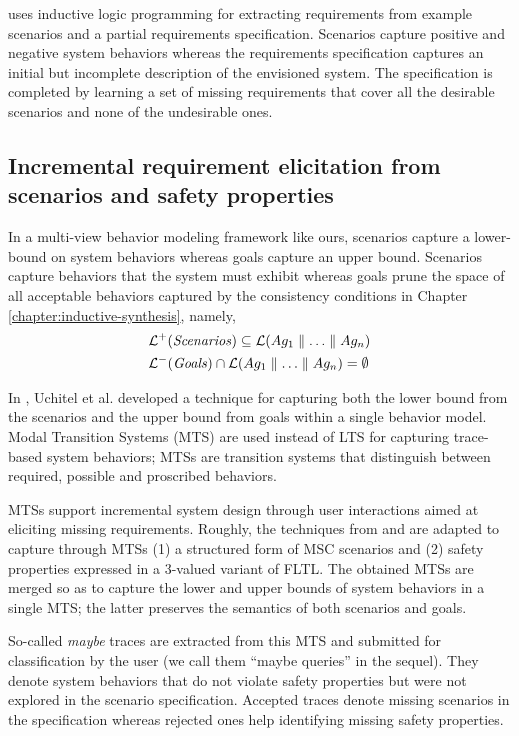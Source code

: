 \cite{Alrajeh:2007} uses inductive logic programming for extracting requirements from example scenarios and a partial requirements specification. Scenarios capture positive and negative system behaviors whereas the requirements specification captures an initial but incomplete description of the envisioned system. The specification is completed by learning a set of missing requirements that cover all the desirable scenarios and none of the undesirable ones.

\subsection{Incremental requirement elicitation from scenarios and safety properties\label{related-for-requirements-2}}

In a multi-view behavior modeling framework like ours, scenarios capture a lower-bound on system behaviors whereas goals capture an upper bound. Scenarios capture behaviors that the system must exhibit whereas goals prune the space of all acceptable behaviors captured by the consistency conditions in Chapter \ref{chapter:inductive-synthesis}, namely,
\begin{align*}
&\mathcal{L}^+(\mbox{\emph{Scenarios}}) \subseteq \mathcal{L}(Ag_1 \parallel \ldots \parallel Ag_n) \\
&\mathcal{L}^-(\mbox{\emph{Goals}}) \cap \mathcal{L}(Ag_1 \parallel \ldots \parallel Ag_n) = \emptyset
\end{align*}

In \cite{Uchitel:2007, Uchitel:2009}, Uchitel et al. developed a technique for capturing both the lower bound from the scenarios and the upper bound from goals within a single behavior model. Modal Transition Systems (MTS) \cite{Larsen:1988} are used instead of LTS for capturing trace-based system behaviors; MTSs are transition systems that distinguish between required, possible and proscribed behaviors.

MTSs support incremental system design through user interactions aimed at eliciting missing requirements. Roughly, the techniques from \cite{Uchitel:2003} and \cite{Giannakopoulou:2003} are adapted to capture through MTSs (1) a structured form of MSC scenarios and (2) safety properties expressed in a 3-valued variant of FLTL. The obtained MTSs are merged so as to capture the lower and upper bounds of system behaviors in a single MTS; the latter preserves the semantics of both scenarios and goals. 

So-called \emph{maybe} traces are extracted from this MTS and submitted for classification by the user (we call them ``maybe queries'' in the sequel). They denote system behaviors that do not violate safety properties but were not explored in the scenario specification. Accepted traces denote missing scenarios in the specification whereas rejected ones help identifying missing safety properties. 


